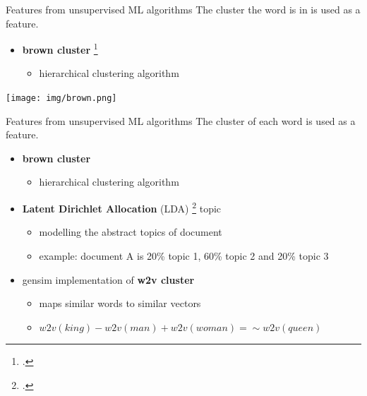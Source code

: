\documentclass[12pt, tikz]{beamer}
\begin{document}
\begin{frame}[fragile]{Features from unsupervised ML algorithms}
	The cluster the word is in is used as a feature.
	\pause
	\begin{itemize}
		\item \textbf{brown cluster} \footcite{brown1992class}
		\begin{itemize}
			\item hierarchical clustering algorithm
		\end{itemize}		
	\end{itemize}
	\begin{center}
		\texttt{[image: img/brown.png]}
	\end{center}
	
\end{frame}

\begin{frame}[fragile]{Features from unsupervised ML algorithms}
	The cluster of each word is used as a feature.
	\begin{itemize}
		\item<1-> \textbf{brown cluster}
		\begin{itemize}
			\item hierarchical clustering algorithm
		\end{itemize}
		\item<1-> \textbf{Latent Dirichlet Allocation} (LDA) \footcite{blei2003latent} topic
		\begin{itemize}
			\item modelling the abstract topics of document
			\item example: document A is 20\% topic 1, 60\% topic 2 and 20\% topic 3
		\end{itemize}
		\item<2-> gensim implementation of \textbf{w2v cluster}
		\begin{itemize}
			\item maps similar words to similar vectors
			\item $w2v(king) - w2v(man) + w2v(woman) = \sim w2v(queen)$
		\end{itemize}
	\end{itemize}
\end{frame}
\end{document}

